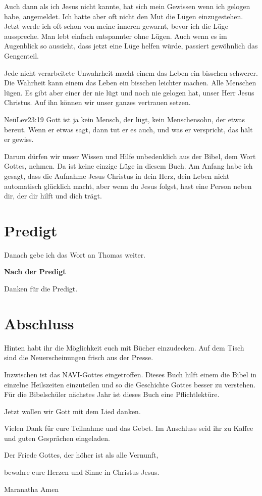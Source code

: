 \documentclass{../inc/mybib}
\begin{document}
\begin{spacing}{1.5}
Auch dann als ich Jesus nicht kannte, hat sich mein Gewissen wenn ich gelogen habe, angemeldet. Ich hatte aber oft nicht den Mut die Lügen einzugestehen. Jetzt werde ich oft schon von meine inneren gewarnt, bevor ich die Lüge ausspreche. Man lebt einfach entspannter ohne Lügen. Auch wenn es im Augenblick so aussieht, dass jetzt eine Lüge helfen würde, passiert gewöhnlich das Gengenteil.

Jede nicht verarbeitete Unwahrheit macht einem das Leben ein bisschen schwerer. Die Wahrheit kann einem das Leben ein bisschen leichter machen.
Alle Menschen lügen. Es gibt aber einer der nie lügt und noch nie gelogen hat, unser Herr Jesus Christus. Auf ihn können wir unser ganzes vertrauen setzen.
\begin{bibelbox}{Neü}{Lev}{23:19}
Gott ist ja kein Mensch, der lügt, kein Menschensohn, der etwas bereut. Wenn er etwas sagt, dann tut er es auch, und was er verspricht, das hält er gewiss.
\end{bibelbox}
Darum dürfen wir unser Wissen und Hilfe unbedenklich aus der Bibel, dem Wort Gottes, nehmen. Da ist keine einzige Lüge in diesem Buch.
Am Anfang habe ich gesagt, dass die Aufnahme Jesus Christus in dein Herz, dein Leben nicht automatisch glücklich macht, aber wenn du Jesus folgst, hast eine Person neben dir, der dir hilft und dich trägt.

\end{spacing}


\section{Predigt}

Danach gebe ich das Wort an Thomas weiter.

\textbf{Nach der Predigt}

Danken für die Predigt.


\section{Abschluss}
Hinten habt ihr die Möglichkeit euch mit Bücher einzudecken. Auf dem Tisch sind die Neuerscheinungen frisch aus der Presse.

Inzwischen ist das NAVI-Gottes eingetroffen. Dieses Buch hilft einem die Bibel in einzelne Heilszeiten einzuteilen und so die Geschichte Gottes besser zu verstehen. Für die Bibelschüler nächstes Jahr ist dieses Buch eine Pflichtlektüre.

Jetzt wollen wir Gott mit dem Lied  danken.

Vielen Dank für eure Teilnahme und das Gebet. Im Anschluss seid ihr zu Kaffee und guten Gesprächen eingeladen.
\beten{} 


Der Friede Gottes, der höher ist als alle Vernunft,

bewahre eure Herzen und Sinne in Christus Jesus.

Maranatha Amen
\end{document}
